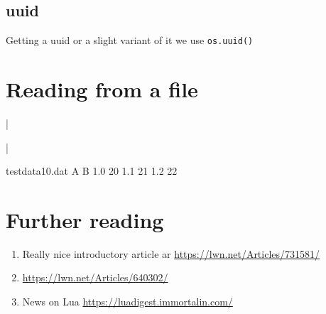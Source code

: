 \subsection{uuid}
Getting a uuid or a slight variant of it we use \lstinline!os.uuid()!



\section{Reading from a file}

|\usepackage{luatextra}|


\begin{filecontents}{testdata10.dat}
  A  B
  1.0 20
  1.1 21
  1.2 22
\end{filecontents}
%
%
%

\section{Further reading}

\begin{enumerate}
\item  Really nice introductory article ar \url{https://lwn.net/Articles/731581/}
\item   \url{https://lwn.net/Articles/640302/}
\item  News on Lua \url{https://luadigest.immortalin.com/}
\end{enumerate}










